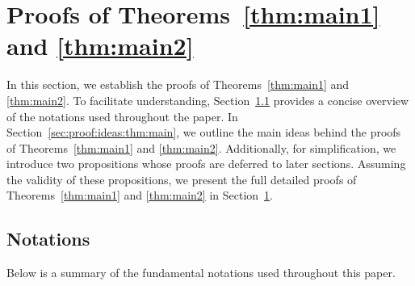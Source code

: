 \documentclass[11pt,a4paper]{article}
\begin{document}
\section{Proofs of Theorems~\ref{thm:main1} and \ref{thm:main2}}
\label{sec:proof:thm:main}

In this section, we establish the proofs of Theorems~\ref{thm:main1} and \ref{thm:main2}. To facilitate understanding, Section~\ref{sec:notation} provides a concise overview of the notations used throughout the paper. In Section~\ref{sec:proof:ideas:thm:main}, we outline the main ideas behind the proofs of Theorems~\ref{thm:main1} and \ref{thm:main2}. Additionally, for simplification, we introduce two propositions whose proofs are deferred to later sections. Assuming the validity of these propositions, we present the full detailed proofs of Theorems~\ref{thm:main1} and \ref{thm:main2} in Section~\ref{sec:proof:thm:main}.




\subsection{Notations}
\label{sec:notation}


Below is a summary of the fundamental notations used throughout this paper.
\end{document}
